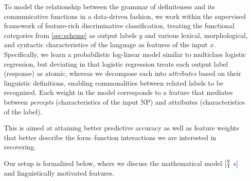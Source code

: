 \documentclass[11pt,letterpaper]{article}
\newcommand{\ensuretext}[1]{#1}
\newcommand{\nssmarker}{\ensuretext{\textcolor{magenta}{\ensuremath{^{\textsc{NS}}_{\textsc{S}}}}}}
\newcommand{\ytmarker}{\ensuretext{\textcolor{blue}{\ensuremath{^{\textsc{Y}}_{\textsc{T}}}}}}
\newcommand{\arkcomment}[3]{\ensuretext{\textcolor{#3}{[#1 #2]}}}
\newcommand{\nss}[1]{\arkcomment{\nssmarker}{#1}{magenta}}
\newcommand{\yt}[1]{\arkcomment{\ytmarker}{#1}{blue}}
\newcommand{\costversion}[1]{}
\begin{document}
To model the relationship between the grammar of definiteness and its communicative functions in a data-driven fashion,
we work within the supervised framework of feature-rich discriminative classification, 
treating the functional categories from \cref{sec:scheme} as output labels $y$
and various lexical, morphological, and syntactic characteristics of the language as features of the input $x$.
Specifically, we learn a probabilistic log-linear model similar to multiclass logistic regression, 
but deviating in that
logistic regression treats each output label (response) as atomic, whereas 
we decompose each into \emph{attributes} based on their linguistic definitions, 
enabling commonalities between related labels to be recognized.
Each weight in the model corresponds to a feature that mediates between 
\emph{percepts} (characteristics of the input NP) and attributes (characteristics of the label).
\costversion{\nss{}the following ways:
\begin{itemize}
  \item Logistic regression treats each output label (response) as atomic; 
  we decompose each into \emph{attributes} based on their linguistic definitions, 
  enabling commonalities between related labels to be recognized.
  Each weight in the model corresponds to a feature that mediates between 
  \emph{percepts} (characteristics of the input NP) and attributes (characteristics of the label).
  \item Logistic regression assumes a prediction is either correct or incorrect.
  We incorporate a \emph{cost function} that gives partial credit during learning when a related label 
  is predicted, so the learned model will better match our evaluation measure.
  \item Logistic regression assumes the space of possible predictions matches 
  the space of labels observed in the training data; we allow more abstract labels to be predicted, 
  which can receive partial credit. The scoring scheme encourages the predictor to ``back off'' 
  to a coarser label if it is not sufficiently confident about a fine-grained label.
\end{itemize}
These decisions are\nss{}}
This is aimed at attaining better predictive accuracy 
as well as feature weights that better describe the form--function interactions we are interested in recovering.

Our setup is formalized below, where we discuss the mathematical model \yt{s} and linguistically motivated features.
\end{document}
